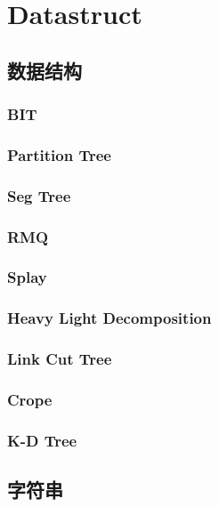 \section{Datastruct}
\large

\subsection{数据结构}
\subsubsection{BIT}

\subsubsection{Partition Tree}

\subsubsection{Seg Tree}

\subsubsection{RMQ}

\subsubsection{Splay}

\subsubsection{Heavy Light Decomposition}

\subsubsection{Link Cut Tree}

\subsubsection{Crope}

\subsubsection{K-D Tree}



\subsection{字符串}

